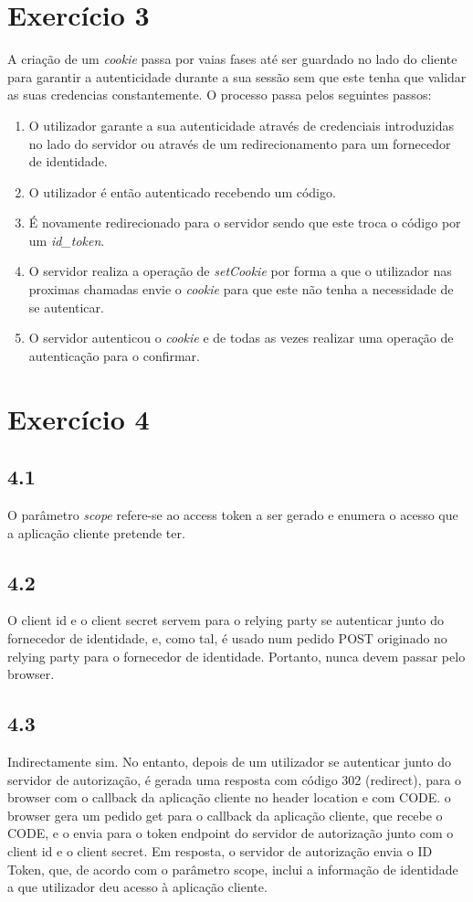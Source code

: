 \documentclass[11pt]{report}
\begin{document}
\section{Exercício 3}
	A criação de um \textit{cookie} passa por vaias fases até ser guardado no lado do cliente para garantir a autenticidade durante a sua sessão sem que este tenha que validar as suas credencias constantemente.
	O processo passa pelos seguintes passos:
	\begin{enumerate}
		\item O utilizador garante a sua autenticidade através de credenciais introduzidas no lado do servidor ou através de um redirecionamento para um fornecedor de identidade.
		\item O utilizador é então autenticado recebendo um código. 
		\item É novamente redirecionado para o servidor sendo que este troca o código por um \textit{id\_token}.
		\item O servidor realiza a operação de \textit{setCookie} por forma a que o utilizador nas proximas chamadas envie o \textit{cookie} para que este não tenha a necessidade de se autenticar.
		\item O servidor autenticou o \textit{cookie} e de todas as vezes realizar uma operação de autenticação para o confirmar.
	\end{enumerate}

\newpage
\section{Exercício 4}
	\subsection*{4.1}
	O parâmetro \textit{scope} refere-se ao access token a ser gerado e enumera o acesso que a aplicação cliente pretende ter.
	\subsection*{4.2}
	O client id e o client secret servem para o relying party se autenticar junto do fornecedor de identidade, e, como tal, é usado num pedido POST originado no relying party para o fornecedor de identidade. Portanto, nunca devem passar pelo browser.
	
	\subsection*{4.3}
	Indirectamente sim. No entanto, depois de um utilizador se autenticar junto do servidor de autorização, é gerada uma resposta com código 302 (redirect), para o browser com o callback da aplicação cliente no header location e com CODE. o browser gera um pedido get para o callback da aplicação cliente, que recebe o CODE, e o envia para o token endpoint do servidor de autorização junto com o client id e o client secret. Em resposta, o servidor de autorização envia o ID Token, que, de acordo com o parâmetro scope, inclui a informação de identidade a que utilizador deu acesso à aplicação cliente.
\end{document}
